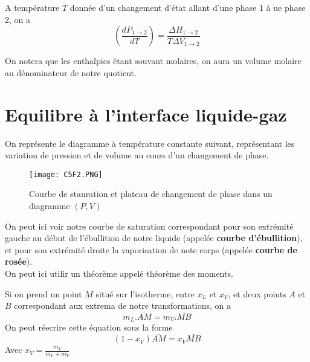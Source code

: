 \begin{theorem}
 A température $T$ donnée d'un changement d'état allant d'une phase 1 à ue phase 2, on a
 \begin{equation}
 \left ( \frac{dP_{1\rightarrow2}}{dT} \right ) = \frac{\Delta H_{1\rightarrow2}}{T \Delta V _{1\rightarrow2}}
 \end{equation}
 \end{theorem}
 
 \begin{remark}
 On notera que les enthalpies étant souvant molaires, on aura un volume molaire au dénominateur de notre quotient.
 \end{remark}
 
 \section{Equilibre à l'interface liquide-gaz}
 
 On représente le diagramme à température constante suivant, représentant les variation de pression et de volume au cours d'un changement de phase.\\
 
 \begin{figure}[H]
 \centering
 \texttt{[image: C5F2.PNG]}
 \caption{Courbe de stauration et plateau de changement de phase dans un diagramme $(P,V)$}
 \end{figure}
 
 On peut ici voir notre courbe de saturation correspondant pour son extrémité gauche au début de l'ébullition de notre liquide (appelée \textbf{courbe d'ébullition}), et pour son extrémité droite la vaporisation de note corps (appelée \textbf{courbe de rosée}).\\
 
 On peut ici utilir un théorème appelé théorème des moments.\\
 
 \begin{theorem}
 Si on prend un point $M$ situé sur l'isotherme, entre $x_L$ et $x_V$, et deux points $A$ et $B$ correspondant aux extrema de notre transformations, on a 
 \begin{equation}
 m_L . \overline{AM} = m_V.\overline{MB}
 \end{equation}
 On peut réecrire cette équation sous la forme
 \begin{equation}
 (1-x_V)\overline{AM}=x_V\overline{MB}
 \end{equation}
 Avec $x_V = \frac{m_V}{m_L+m_V}$
 \end{theorem}
 
